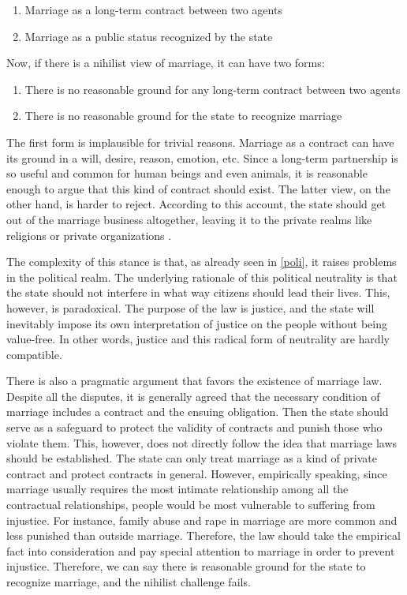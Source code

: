 \documentclass[man,floatsintext]{apa7}
\begin{document}
\begin{enumerate}
\item {Marriage as a long-term contract between two agents}
\item {Marriage as a public status recognized by the state}
\end{enumerate}

Now, if there is a nihilist view of marriage, it can have two forms:

\begin{enumerate}
\item {There is no reasonable ground for any long-term contract between two agents}
\item {There is no reasonable ground for the state to recognize marriage}
\end{enumerate}

The first form is implausible for trivial reasons. Marriage as a contract can have its ground in a will, desire, reason, emotion, etc. Since a long-term partnership is so useful and common for human beings and even animals, it is reasonable enough to argue that this kind of contract should exist. The latter view, on the other hand, is harder to reject. According to this account, the state should get out of the marriage business altogether, leaving it to the private realms like religions or private organizations \autocite{sunsteinPrivatizingMarriage2008,chartierPublicPracticePrivate2016}.

The complexity of this stance is that, as already seen in \ref{poli}, it raises problems in the political realm. The underlying rationale of this political neutrality is that the state should not interfere in what way citizens should lead their lives. This, however, is paradoxical. The purpose of the law is justice, and the state will inevitably impose its own interpretation of justice on the people without being value-free. In other words, justice and this radical form of neutrality are hardly compatible. 

There is also a pragmatic argument that favors the existence of marriage law. Despite all the disputes, it is generally agreed that the necessary condition of marriage includes a contract and the ensuing obligation.\autocite{brakeMarriageDomesticPartnership2023} Then the state should serve as a safeguard to protect the validity of contracts and punish those who violate them. This, however, does not directly follow the idea that marriage laws should be established. The state can only treat marriage as a kind of private contract and protect contracts in general. However, empirically speaking, since marriage usually requires the most intimate relationship among all the contractual relationships, people would be most vulnerable to suffering from injustice. For instance, family abuse and rape in marriage are more common and less punished than outside marriage. Therefore, the law should take the empirical fact into consideration and pay special attention to marriage in order to prevent injustice. Therefore, we can say there is reasonable ground for the state to recognize marriage, and the nihilist challenge fails.
\end{document}
